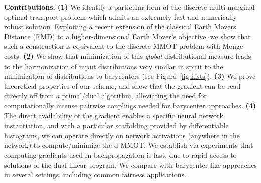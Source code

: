 \noindent\textbf{Contributions.}  \textbf{(1)} We identify a particular form of the discrete multi-marginal optimal transport problem
which admits an extremely fast and numerically robust solution.
Exploiting a recent extension of 
the classical Earth Movers Distance (EMD) to a higher-dimensional Earth Mover's objective,
we show that such a construction is equivalent
to the discrete MMOT problem with Monge costs.
\textbf{(2)} We show that minimization of this \textit{global} distributional measure
leads to the 
harmonization of input distributions very similar in spirit to the minimization of distributions to barycenters (see Figure~\ref{fig:hists}).
\textbf{(3)} We prove theoretical properties of our scheme, and show that 
the gradient can be read directly off from a primal/dual algorithm,
alleviating the need for 
computationally intense 
pairwise couplings needed for barycenter approaches.
\textbf{(4)} The direct availability of the gradient
enables a specific neural network instantiation,
and
with a particular scaffolding provided by differentiable histograms, 
we can operate directly on network activations (anywhere in the network) to compute/minimize the d-MMOT. 
We establish via experiments that computing gradients used in backpropagation is fast, due to rapid access to solutions of the dual linear program.
We compare with barycenter-like approaches in several settings, including common fairness applications.

